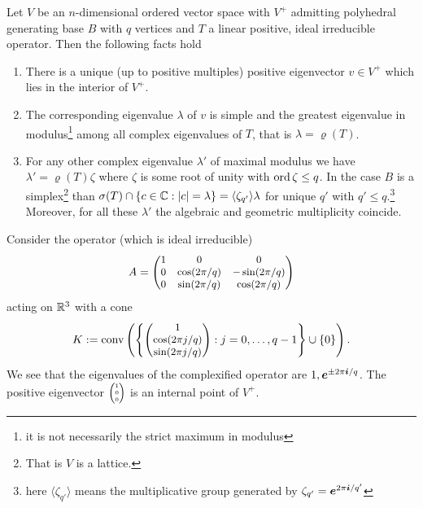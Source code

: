 \documentclass{article}
\begin{document}
\begin{theorem}\label{theo2}
Let $V$ be an $n$-dimensional ordered vector space with $V^+$ admitting polyhedral generating base $B$ with $q$ vertices and $T$ a linear positive, ideal irreducible operator. Then the following facts hold
\begin{enumerate}
\item There is a unique (up to positive multiples) positive eigenvector $v\in V^+$ which lies in the interior of $V^+$.
\item The corresponding eigenvalue $\lambda$ of $v$ is simple and the greatest eigenvalue in modulus\footnote{it is not necessarily the strict maximum in modulus} among all complex eigenvalues of $T$, that is $\lambda=\varrho(T)$.
\item For any other complex eigenvalue $\lambda'$ of maximal modulus we have $\lambda'=\varrho(T)\zeta$ where $\zeta$ is some root of unity with $\operatorname{ord}{\zeta}\leq q$. 
In the case $B$ is a simplex\footnote{That is $V$ is a lattice.} than $\sigma(T)\cap\{c\in\mathbb{C}:|c|=\lambda\}=\langle \zeta_{q'}\rangle \lambda$ for unique $q'$ with $q'\leq q$.\footnote{here $\langle \zeta_{q'}\rangle$ means the multiplicative group generated by $\zeta_{q'}=\boldsymbol{e}^{2\pi\boldsymbol{i}/q'}$} Moreover, for all these $\lambda'$ the algebraic and geometric multiplicity coincide.
\end{enumerate}
\end{theorem}

\begin{example}
Consider the operator (which is ideal irreducible)
\begin{equation}
A=\small\begin{pmatrix}
1 & 0 & 0 \\ 0 & \cos(2\pi/q) & -\sin(2\pi/q) \\ 0 & \sin(2\pi/q) & \cos(2\pi/q)
\end{pmatrix}
\end{equation} 
acting on $\mathbb{R}^3$ with a cone 
\begin{equation} 
K:=\operatorname{conv}\left(\left\{
\small\begin{pmatrix}
1\\
\cos(2\pi j/q)\\
\sin(2\pi j/q)
\end{pmatrix}
:j=0,\ldots,q-1\right\}\cup\{0\}\right)\text{.}
\end{equation}
We see that the eigenvalues of the complexified operator are $1,\boldsymbol{e}^{\pm 2\pi\boldsymbol{i}/q}$. The positive eigenvector $\tiny\begin{pmatrix}
1 \\
0 \\
0 
\end{pmatrix}$ is an internal point of $V^+$.
\end{example}
\end{document}
